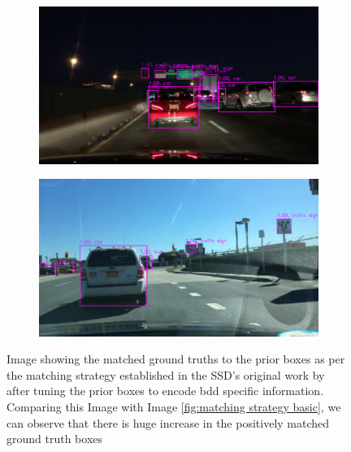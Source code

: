     \begin{figure}
        \begin{center}
        \begin{subfigure}[t]{0.9\textwidth}
    		\centering
    		\includegraphics[width=\textwidth]{images/dataset_images/tuned_9.png}
    	\end{subfigure}
    	\end{center}
        	
    \begin{center}
    	\begin{subfigure}[t]{0.9\textwidth}
    		\centering
    		\includegraphics[width=\textwidth]{images/dataset_images/tuned_10.png}
    	\end{subfigure}
            \caption[Tuned prior boxes matched to ground truth]{Image showing the matched ground truths to the prior boxes as per the matching strategy established in the SSD's original work by \citet{Liu2016SSDSS} after tuning the prior boxes to encode \acrshort{bdd} specific information. Comparing this Image with Image \ref{fig:matching strategy basic}, we can observe that there is huge increase in the positively matched ground truth boxes}
            \label{fig:matching strategy tuned}
    \end{center}
    \end{figure}
    
